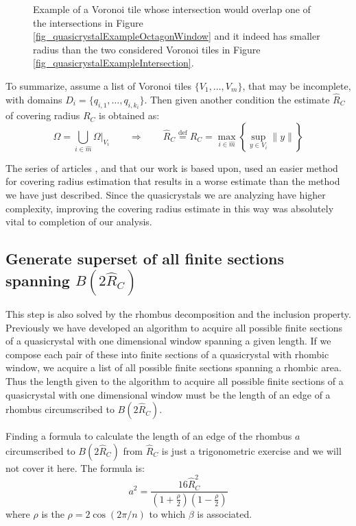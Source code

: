 \documentclass[text.tex]{subfiles}
\begin{document}
\begin{figure}[h!]
\begin{minipage}{0.4\textwidth}
\end{minipage}
\caption{Example of a Voronoi tile whose intersection would overlap one of the intersections in Figure \ref{fig_quasicrystalExampleOctagonWindow} and it indeed has smaller radius than the two considered Voronoi tiles in Figure \ref{fig_quasicrystalExampleIntersection}. }
\label{fig_quasicrystalExampleIntersection02}
\end{figure}

To summarize, assume a list of Voronoi tiles $\{V_1,\dots,V_m\}$, that may be incomplete, with domains $D_i = \{q_{i,1},\dots,q_{i,k_i}\}$. Then given another condition the estimate $\hat{R}_C$ of covering radius $R_C$ is obtained as:
$$\Omega = \bigcup\limits_{i\in\hat{m}}\Omega|_{V_i} \qquad\Rightarrow\qquad \hat{R}_C \overset{\text{def}}{=} R_C = \max_{i\in\hat{m}}\left\{\sup_{y\in V_i}\lVert y\rVert\right\}$$

The series of articles \cite{classification}, \cite{classificationII} and \cite{classificationIII} that our work is based upon, used an easier method for covering radius estimation that results in a worse estimate than the method we have just described. Since the quasicrystals we are analyzing have higher complexity, improving the covering radius estimate in this way was absolutely vital to completion of our analysis. 

\subsection{Generate superset of all finite sections spanning $B(2\hat{R}_C)$}\label{sec_2DsupersetFiniteSections}
This step is also solved by the rhombus decomposition and the inclusion property. Previously we have developed an algorithm to acquire all possible finite sections of a quasicrystal with one dimensional window spanning a given length. If we compose each pair of these into finite sections of a quasicrystal with rhombic window, we acquire a list of all possible finite sections spanning a rhombic area. Thus the length given to the algorithm to acquire all possible finite sections of a quasicrystal with one dimensional window must be the length of an edge of a rhombus circumscribed to $B(2\hat{R}_C)$. 

Finding a formula to calculate the length of an edge of the rhombus $a$ circumscribed to $B(2\hat{R}_C)$ from $\hat{R}_C$ is just a trigonometric exercise and we will not cover it here. The formula is: 
$$a^2 = \frac{16\hat{R}_C^2}{\left(1+\frac{\rho}{2}\right)\left(1-\frac{\rho}{2}\right)}$$
where $\rho$ is the $\rho=2\cos\left(2\pi/n\right)$ to which $\beta$ is associated. 
\end{document}
